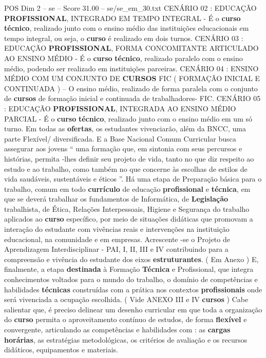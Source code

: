 \begin{textsample}{POS Dim 2 – se – Score 31.00 – se/se\_em\_30.txt}
CENÁRIO 02 : EDUCAÇÃO \textbf{PROFISSIONAL}, INTEGRADO EM TEMPO INTEGRAL - É o \textbf{curso} \textbf{técnico}, realizado junto com o ensino médio das instituições educacionais em tempo integral, ou seja, o \textbf{curso} é realizado em dois turnos.
CENÁRIO 03 : EDUCAÇÃO \textbf{PROFISSIONAL}, FORMA CONCOMITANTE ARTICULADO AO ENSINO MÉDIO - É o \textbf{curso} \textbf{técnico}, realizado paralelo com o ensino médio, podendo ser realizado em instituições parceiras.
CENÁRIO 04 : ENSINO MÉDIO COM UM CONJUNTO DE \textbf{CURSOS} FIC ( FORMAÇÃO INICIAL E CONTINUADA ) – O ensino médio, realizado de forma paralela com o conjunto de \textbf{cursos} de formação inicial e continuada de trabalhadores- FIC.
CENÁRIO 05 : EDUCAÇÃO \textbf{PROFISSIONAL}, INTEGRADA AO ENSINO MÉDIO PARCIAL - É o \textbf{curso} \textbf{técnico}, realizado junto com o ensino médio em um só turno.
Em todas as \textbf{ofertas}, os estudantes vivenciarão, além da BNCC, uma parte Flexível/ diversificada.
E a Base Nacional Comum Curricular busca assegurar aos jovens “ uma formação que, em sintonia com seus percursos e histórias, permita -lhes definir seu projeto de vida, tanto no que diz respeito ao estudo e ao trabalho, como também no que concerne às escolhas de estilos de vida saudáveis, sustentáveis e éticos ”.
Há uma etapa de Preparação básica para o trabalho, comum em todo \textbf{currículo} de educação \textbf{profissional} e \textbf{técnica}, em que se deverá trabalhar os fundamentos de Informática, de \textbf{Legislação} trabalhista, de Ética, Relações Interpessoais, Higiene e Segurança do trabalho aplicados ao \textbf{curso} específico, por meio de situações didáticas que promovam a interação do estudante com vivências reais e intervenções na instituição educacional, na comunidade e em empresas.
Acrescente -se o Projeto de Aprendizagem Interdisciplinar - PAI, I, II, III e IV contribuindo para a compreensão e vivência do estudante dos eixos \textbf{estruturantes}. ( Em Anexo ) E, finalmente, a etapa \textbf{destinada} à Formação \textbf{Técnica} e Profissional, que integra conhecimentos voltados para o mundo do trabalho, o domínio de competências e habilidades \textbf{técnicas} construídas com a prática nos contextos \textbf{profissionais} onde será vivenciada a ocupação escolhida. ( Vide ANEXO III e IV \textbf{cursos} ) Cabe salientar que, é preciso delinear um desenho curricular em que toda a organização do \textbf{curso} permita o aproveitamento contínuo de estudos, de forma \textbf{flexível} e convergente, articulando as competências e habilidades com : as \textbf{cargas} \textbf{horárias}, as estratégias metodológicas, os critérios de avaliação e os recursos didáticos, equipamentos e materiais.

\end{textsample}
